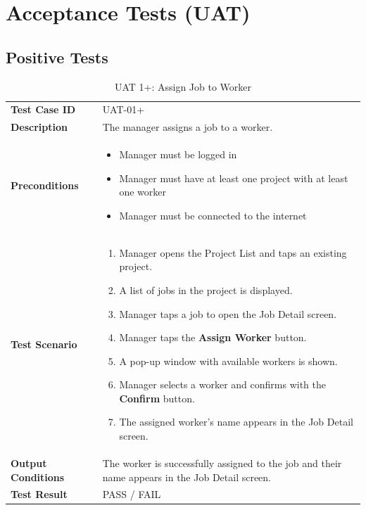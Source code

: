 \documentclass[12pt,a4paper]{article}
\begin{document}

\section{Acceptance Tests (UAT)}

\subsection*{Positive Tests}

\begin{table}[h]
\centering
\caption{UAT 1+: Assign Job to Worker}
\begin{tabularx}{\textwidth}{>{\bfseries}l X}
\toprule
Test Case ID & UAT-01+ \\
Description & The manager assigns a job to a worker. \\
Preconditions &
\begin{itemize}[noitemsep]
    \item Manager must be logged in
    \item Manager must have at least one project with at least one worker
    \item Manager must be connected to the internet
\end{itemize} \\
Test Scenario &
\begin{enumerate}[noitemsep]
    \item Manager opens the Project List and taps an existing project.
    \item A list of jobs in the project is displayed.
    \item Manager taps a job to open the Job Detail screen.
    \item Manager taps the \textbf{Assign Worker} button.
    \item A pop-up window with available workers is shown.
    \item Manager selects a worker and confirms with the \textbf{Confirm} button.
    \item The assigned worker's name appears in the Job Detail screen.
\end{enumerate} \\
Output Conditions & The worker is successfully assigned to the job and their name appears in the Job Detail screen. \\
Test Result & PASS / FAIL \\
\bottomrule
\end{tabularx}
\end{table}
\end{document}
